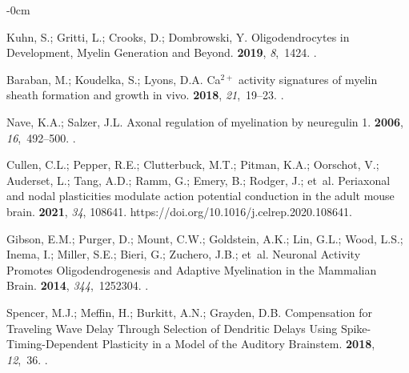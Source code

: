 \documentclass[brainsci, %
               review,accept,pdftex,moreauthors
               ]{Definitions/mdpi}
\begin{document}
\begin{adjustwidth}{-\extralength}{0cm}
\begin{thebibliography}{999}
Kuhn, S.; Gritti, L.; Crooks, D.; Dombrowski, Y.
\newblock Oligodendrocytes in {Development}, {Myelin} {Generation} and
  {Beyond}.
 {\bf 2019}, {\em 8},~1424.
.

Baraban, M.; Koudelka, S.; Lyons, D.A.
\newblock Ca$^{2+}$ activity signatures of myelin sheath formation and growth in
  vivo.
 {\bf 2018}, {\em 21},~19--23.
.

Nave, K.A.; Salzer, J.L.
\newblock Axonal regulation of myelination by neuregulin 1.
 {\bf 2006}, {\em 16},~492--500.
.

Cullen, C.L.; Pepper, R.E.; Clutterbuck, M.T.; Pitman, K.A.; Oorschot, V.;
  Auderset, L.; Tang, A.D.; Ramm, G.; Emery, B.; Rodger, J.;  et~al.
\newblock Periaxonal and nodal plasticities modulate action potential
  conduction in the adult mouse brain.
 {\bf 2021}, {\em 34}, 108641.
  {{https://doi.org/10.1016/j.celrep.2020.108641}}.

Gibson, E.M.; Purger, D.; Mount, C.W.; Goldstein, A.K.; Lin, G.L.; Wood, L.S.;
  Inema, I.; Miller, S.E.; Bieri, G.; Zuchero, J.B.;  et~al.
\newblock Neuronal {Activity} {Promotes} {Oligodendrogenesis} and {Adaptive}
  {Myelination} in the {Mammalian} {Brain}.
 {\bf 2014}, {\em 344},~1252304.
.

Spencer, M.J.; Meffin, H.; Burkitt, A.N.; Grayden, D.B.
\newblock Compensation for {Traveling} {Wave} {Delay} {Through} {Selection} of
  {Dendritic} {Delays} {Using} {Spike}-{Timing}-{Dependent} {Plasticity} in a
  {Model} of the {Auditory} {Brainstem}.
 {\bf 2018}, {\em
  12},~36.
.


\end{thebibliography}
\end{adjustwidth}
\end{document}
